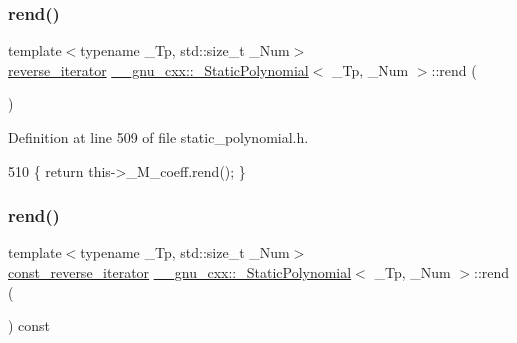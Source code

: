 \subsubsection{\texorpdfstring{rend()}{rend()}\hspace{0.1cm}{\footnotesize\ttfamily [1/2]}}
{\footnotesize\ttfamily template$<$typename \+\_\+\+Tp, std\+::size\+\_\+t \+\_\+\+Num$>$ \\
\hyperlink{class____gnu__cxx_1_1__StaticPolynomial_ab6a9fab0cd102db2a5bfd00fe9f35e4d}{reverse\+\_\+iterator} \hyperlink{class____gnu__cxx_1_1__StaticPolynomial}{\+\_\+\+\_\+gnu\+\_\+cxx\+::\+\_\+\+Static\+Polynomial}$<$ \+\_\+\+Tp, \+\_\+\+Num $>$\+::rend (\begin{DoxyParamCaption}{ }\end{DoxyParamCaption})\hspace{0.3cm}{\ttfamily [inline]}}



Definition at line 509 of file static\+\_\+polynomial.\+h.


\begin{DoxyCode}
510       \{ \textcolor{keywordflow}{return} this->\_M\_coeff.rend(); \}
\end{DoxyCode}
\mbox{\label{class____gnu__cxx_1_1__StaticPolynomial_aab031f4e8c0ac973f13de88564461ada}} 
\subsubsection{\texorpdfstring{rend()}{rend()}\hspace{0.1cm}{\footnotesize\ttfamily [2/2]}}
{\footnotesize\ttfamily template$<$typename \+\_\+\+Tp, std\+::size\+\_\+t \+\_\+\+Num$>$ \\
\hyperlink{class____gnu__cxx_1_1__StaticPolynomial_a03b96649dc974fc6829342659325b7cb}{const\+\_\+reverse\+\_\+iterator} \hyperlink{class____gnu__cxx_1_1__StaticPolynomial}{\+\_\+\+\_\+gnu\+\_\+cxx\+::\+\_\+\+Static\+Polynomial}$<$ \+\_\+\+Tp, \+\_\+\+Num $>$\+::rend (\begin{DoxyParamCaption}{ }\end{DoxyParamCaption}) const\hspace{0.3cm}{\ttfamily [inline]}}




